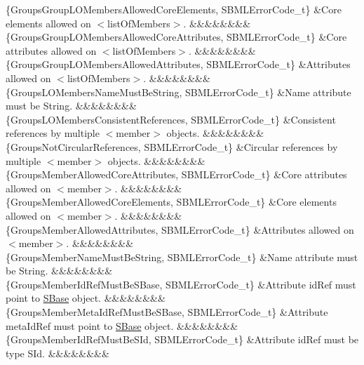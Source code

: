 \begin{DoxyParagraph}{}
\begin{longtabu}
\{Groups\+Group\+L\+O\+Members\+Allowed\+Core\+Elements, S\+B\+M\+L\+Error\+Code\+\_\+t\} &Core elements allowed on {\ttfamily $<$list\+Of\+Members$>$}. &&&&&&&&\\
\{Groups\+Group\+L\+O\+Members\+Allowed\+Core\+Attributes, S\+B\+M\+L\+Error\+Code\+\_\+t\} &Core attributes allowed on {\ttfamily $<$list\+Of\+Members$>$}. &&&&&&&&\\
\{Groups\+Group\+L\+O\+Members\+Allowed\+Attributes, S\+B\+M\+L\+Error\+Code\+\_\+t\} &Attributes allowed on {\ttfamily $<$list\+Of\+Members$>$}. &&&&&&&&\\
\{Groups\+L\+O\+Members\+Name\+Must\+Be\+String, S\+B\+M\+L\+Error\+Code\+\_\+t\} &Name attribute must be String. &&&&&&&&\\
\{Groups\+L\+O\+Members\+Consistent\+References, S\+B\+M\+L\+Error\+Code\+\_\+t\} &Consistent references by multiple {\ttfamily $<$member$>$} objects. &&&&&&&&\\
\{Groups\+Not\+Circular\+References, S\+B\+M\+L\+Error\+Code\+\_\+t\} &Circular references by multiple {\ttfamily $<$member$>$} objects. &&&&&&&&\\
\{Groups\+Member\+Allowed\+Core\+Attributes, S\+B\+M\+L\+Error\+Code\+\_\+t\} &Core attributes allowed on {\ttfamily $<$member$>$}. &&&&&&&&\\
\{Groups\+Member\+Allowed\+Core\+Elements, S\+B\+M\+L\+Error\+Code\+\_\+t\} &Core elements allowed on {\ttfamily $<$member$>$}. &&&&&&&&\\
\{Groups\+Member\+Allowed\+Attributes, S\+B\+M\+L\+Error\+Code\+\_\+t\} &Attributes allowed on {\ttfamily $<$member$>$}. &&&&&&&&\\
\{Groups\+Member\+Name\+Must\+Be\+String, S\+B\+M\+L\+Error\+Code\+\_\+t\} &Name attribute must be String. &&&&&&&&\\
\{Groups\+Member\+Id\+Ref\+Must\+Be\+S\+Base, S\+B\+M\+L\+Error\+Code\+\_\+t\} &Attribute \textquotesingle{}id\+Ref\textquotesingle{} must point to \hyperlink{class_s_base}{S\+Base} object. &&&&&&&&\\
\{Groups\+Member\+Meta\+Id\+Ref\+Must\+Be\+S\+Base, S\+B\+M\+L\+Error\+Code\+\_\+t\} &Attribute \textquotesingle{}meta\+Id\+Ref\textquotesingle{} must point to \hyperlink{class_s_base}{S\+Base} object. &&&&&&&&\\
\{Groups\+Member\+Id\+Ref\+Must\+Be\+S\+Id, S\+B\+M\+L\+Error\+Code\+\_\+t\} &Attribute \textquotesingle{}id\+Ref\textquotesingle{} must be type \textquotesingle{}S\+Id\textquotesingle{}. &&&&&&&&\\

\end{longtabu}
\end{DoxyParagraph}
